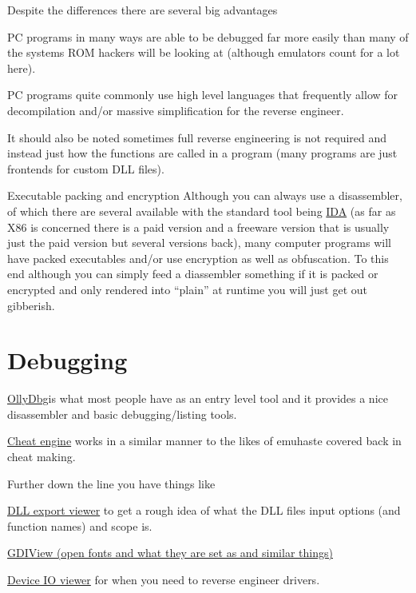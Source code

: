 \documentclass[
]{book}
\begin{document}
Despite the differences there are several big advantages

PC programs in many ways are able to be debugged far more easily than many of the systems ROM hackers will be looking at (although emulators count for a lot here).

PC programs quite commonly use high level languages that frequently allow for decompilation and/or massive simplification for the reverse engineer.

It should also be noted sometimes full reverse engineering is not required and instead just how the functions are called in a program (many programs are just frontends for custom DLL files).

Executable packing and encryption Although you can always use a disassembler, of which there are several available with the standard tool being \href{http://www.hex-rays.com/products/ida/index.shtml}{IDA} (as far as X86 is concerned there is a paid version and a freeware version that is usually just the paid version but several versions back), many computer programs will have packed executables and/or use encryption as well as obfuscation. To this end although you can simply feed a diassembler something if it is packed or encrypted and only rendered into ``plain'' at runtime you will just get out gibberish.

\hypertarget{debugging}{%
\section{Debugging}\label{debugging}}

\href{http://www.ollydbg.de/}{OllyDbg}is what most people have as an entry level tool and it provides a nice disassembler and basic debugging/listing tools.

\href{http://cheatengine.org/}{Cheat engine} works in a similar manner to the likes of emuhaste covered back in cheat making.

Further down the line you have things like

\href{http://www.nirsoft.net/utils/dll_export_viewer.html}{DLL export viewer} to get a rough idea of what the DLL files input options (and function names) and scope is.

\href{http://www.nirsoft.net/utils/gdi_handles.html}{GDIView (open fonts and what they are set as and similar things)}

\href{http://www.nirsoft.net/utils/device_io_view.html}{Device IO viewer} for when you need to reverse engineer drivers.
\end{document}
